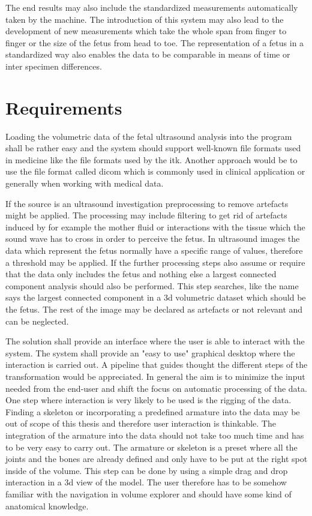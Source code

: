The end results may also include the standardized measurements automatically taken by the machine. The introduction of this system may also lead to the development of new measurements which take the whole span from finger to finger or the size of the fetus from head to toe. The representation of a fetus in a standardized way also enables the data to be comparable in means of time or inter specimen differences.

\section{Requirements}

Loading the volumetric data of the fetal ultrasound analysis into the program shall be rather easy and the system should support well-known file formats used in medicine like the file formats used by the \gls{itk}. Another approach would be to use the file format called \gls{dicom} which is commonly used in clinical application or generally when working with medical data.\newline

If the source is an ultrasound investigation preprocessing to remove artefacts might be applied. The processing may include filtering to get rid of artefacts induced by for example the mother fluid or interactions with the tissue which the sound wave has to cross in order to perceive the fetus. In ultrasound images the data which represent the fetus normally have a specific range of values, therefore a threshold may be applied. If the further processing steps also assume or require that the data only includes the fetus and nothing else a largest connected component analysis should also be performed. This step searches, like the name says the largest connected component in a \gls{3d} volumetric dataset which should be the fetus. The rest of the image may be declared as artefacts or not relevant and can be neglected.\newline

The solution shall provide an interface where the user is able to interact with the system. The system shall provide an "easy to use" graphical desktop where the interaction is carried out. A  pipeline that guides thought the different steps of the transformation would be appreciated. In general the aim is to minimize the input needed from the end-user and shift the focus on automatic processing of the data. One step where interaction is very likely to be used is the rigging of the data. Finding a skeleton or incorporating a predefined armature into the data may be out of scope of this thesis and therefore user interaction is thinkable. The integration of the armature into the data should not take too much time and has to be very easy to carry out. The armature or skeleton is a preset where all the joints and the bones are already defined and only have to be put at the right spot inside of the volume. This step can be done by using a simple drag and drop interaction in a \gls{3d} view of the model. The user therefore has to be somehow familiar with the navigation in volume explorer and should have some kind of anatomical knowledge.\newline

